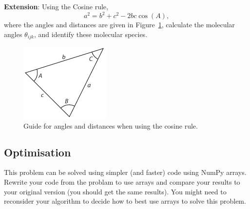 \documentclass[a4paper]{article}
\begin{document}
\textbf{Extension}: Using the Cosine rule,
%
\begin{equation}
  a^2 = b^2 + c^2 -2bc\cos(A),
\end{equation}
%
where the angles and distances are given in Figure~\ref{fig:cosine}, calculate the molecular angles $\theta_{ijk}$, and identify these molecular species.
%
\begin{figure}[t]
\centering
\includegraphics[width=0.4\textwidth]{triangle}
\caption{\label{fig:cosine} Guide for angles and distances when using the cosine rule.}
\end{figure}
%

\subsection{Optimisation}
This problem can be solved using simpler (and faster) code using NumPy arrays. Rewrite your code from the problam to use arrays and compare your results to your original version (you should get the same results). You might need to reconsider your algorithm to decide how to best use arrays to solve this problem.



\end{document}
